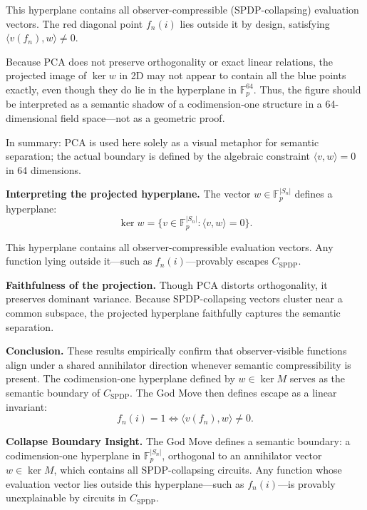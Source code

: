 \documentclass[12pt]{article}
\theoremstyle{definition}
\theoremstyle{definition}
\theoremstyle{remark}
\theoremstyle{remark}
\begin{document}
This hyperplane contains all observer-compressible (SPDP-collapsing) evaluation vectors. The red diagonal point $f_n(i)$ lies outside it by design, satisfying $\langle v(f_n), w \rangle \neq 0$.

Because PCA does not preserve orthogonality or exact linear relations, the projected image of $\ker w$ in 2D may not appear to contain all the blue points exactly, even though they do lie in the hyperplane in $\mathbb{F}_p^{64}$. Thus, the figure should be interpreted as a semantic shadow of a codimension-one structure in a 64-dimensional field space---not as a geometric proof.

In summary: PCA is used here solely as a visual metaphor for semantic separation; the actual boundary is defined by the algebraic constraint $\langle v, w \rangle = 0$ in 64 dimensions.

\textbf{Interpreting the projected hyperplane.} The vector $w \in \mathbb{F}_p^{|S_n|}$ defines a hyperplane:
\begin{equation}
\ker w = \{v \in \mathbb{F}_p^{|S_n|} : \langle v, w \rangle = 0\}.
\end{equation}

This hyperplane contains all observer-compressible evaluation vectors. Any function lying outside it---such as $f_n(i)$---provably escapes $C_{\text{SPDP}}$.

\textbf{Faithfulness of the projection.} Though PCA distorts orthogonality, it preserves dominant variance. Because SPDP-collapsing vectors cluster near a common subspace, the projected hyperplane faithfully captures the semantic separation.

\textbf{Conclusion.} These results empirically confirm that observer-visible functions align under a shared annihilator direction whenever semantic compressibility is present. The codimension-one hyperplane defined by $w \in \ker M$ serves as the semantic boundary of $C_{\text{SPDP}}$. The God Move then defines escape as a linear invariant:
\begin{equation}
f_n(i) = 1 \Leftrightarrow \langle v(f_n), w \rangle \neq 0.
\end{equation}

\textbf{Collapse Boundary Insight.} The God Move defines a semantic boundary: a codimension-one hyperplane in $\mathbb{F}_p^{|S_n|}$, orthogonal to an annihilator vector $w \in \ker M$, which contains all SPDP-collapsing circuits. Any function whose evaluation vector lies outside this hyperplane---such as $f_n(i)$---is provably unexplainable by circuits in $C_{\text{SPDP}}$.
\end{document}
